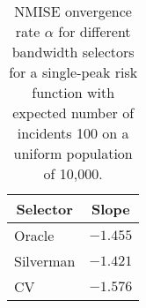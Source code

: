 \begin{table}[htbp]
\begin{center}
\begin{tabular}{lr}
\hline\hline
\multicolumn{1}{c}{Selector}&\multicolumn{1}{c}{Slope}\tabularnewline
\hline
Oracle&$-1.455$\tabularnewline
Silverman&$-1.421$\tabularnewline
CV&$-1.576$\tabularnewline
\hline
\end{tabular}
\caption[NMISE Convergence rate of bandwidth selectors]{NMISE onvergence rate $\alpha$ for different bandwidth selectors for a single-peak risk function with expected number of incidents 100 on a uniform population of 10,000.\label{tab:results:nmise_alpha_by_selector}}\end{center}
\end{table}
